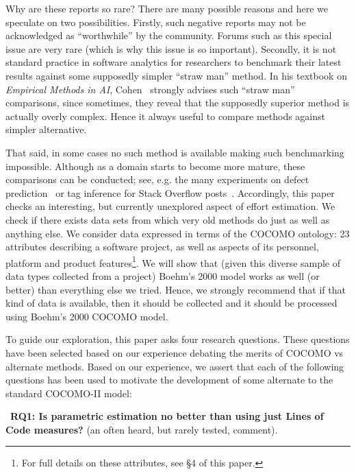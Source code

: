 \documentclass[smallcondesed]{svjour3}
\newenvironment{BLUE}{\color{blue}}{\ignorespacesafterend}
\newcommand{\HERE}[1]{\label{err:#1}
 \reversemarginpar\marginnote{\textcolor{blue}{(#1)}}}
\begin{document}
Why are these reports so rare? There are many possible reasons and here we speculate on two possibilities.
Firstly, such negative reports may not be acknowledged as ``worthwhile'' by the community. Forums such
as this special issue are very rare (which is why this issue is so important).
Secondly, it is not standard practice in software analytics for researchers to benchmark their latest
results against some supposedly simpler ``straw man'' method. In his textbook on {\em Empirical Methods in AI}, Cohen~\cite{cohen95} strongly advises such ``straw man'' comparisons, since sometimes, they reveal that the supposedly
superior method is actually overly complex. Hence it
always useful  to compare methods
against simpler alternative. 

\begin{BLUE}\HERE{Reviewer1b} That said,
in some  cases no such method is available making such  benchmarking impossible. Although as a   domain starts to become more mature,
these comparisons can be conducted; see, e.g. the
many experiments on defect prediction~\cite{Scanniello2013} or tag inference for Stack Overflow posts~\cite{stanley2013predicting}.
\end{BLUE}
Accordingly, this paper checks an interesting,
but currently unexplored aspect of effort estimation.
We check
if there exists data sets from which  very old methods do just as well as anything else. 
We consider data expressed in terms of the COCOMO ontology: 23 attributes describing
a software project,  as well as aspects of its personnel, platform and product features\footnote{For full details on these attributes, see {\S}4 of this paper.}. We will show
that (given this diverse sample of data types collected from a project)   Boehm's 2000 model works
as well (or better) than everything else we tried.  Hence, we strongly recommend that if that kind
of data is available, then it should be collected and it should be processed using Boehm's 2000 COCOMO model.


To guide our exploration,
 this paper asks four research questions.  These
 questions have been selected based  on our experience debating
 the merits of COCOMO vs alternate methods. Based on our experience,
 we assert that each of the following questions has been used to motivate
 the development of some alternate to the standard COCOMO-II model:


~{\bf RQ1: Is parametric estimation no better than
   using just Lines of Code measures?} 
  (an   often heard, but rarely tested, comment).
\end{document}
